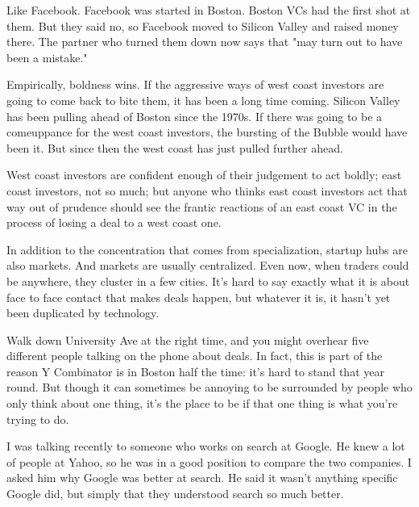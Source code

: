 Like Facebook. Facebook was started in
                  Boston. Boston VCs had the first shot at them. But they said
                  no, so Facebook moved to Silicon Valley and raised money
                  there. The partner who turned them down now says that "may
                  turn out to have been a mistake."

Empirically,
                  boldness wins. If the aggressive ways of west coast investors
                  are going to come back to bite them, it has been a long time
                  coming. Silicon Valley has been pulling ahead of Boston since
                  the 1970s. If there was going to be a comeuppance for the west
                  coast investors, the bursting of the Bubble would have been
                  it. But since then the west coast has just pulled further
                  ahead.

West coast investors are confident enough of
                  their judgement to act boldly; east coast investors, not so
                  much; but anyone who thinks east coast investors act that way
                  out of prudence should see the frantic reactions of an east
                  coast VC in the process of losing a deal to a west coast
                  one.

In addition to the concentration that comes
                  from specialization, startup hubs are also markets. And
                  markets are usually centralized. Even now, when traders could
                  be anywhere, they cluster in a few cities. It's hard to say
                  exactly what it is about face to face contact that makes deals
                  happen, but whatever it is, it hasn't yet been duplicated by
                  technology.

Walk down University Ave at the right
                  time, and you might overhear five different people talking on
                  the phone about deals. In fact, this is part of the reason Y
                  Combinator is in Boston half the time: it's hard to stand that
                  year round. But though it can sometimes be annoying to be
                  surrounded by people who only think about one thing, it's the
                  place to be if that one thing is what you're trying to do.

I
                  was talking recently to someone who works on search at Google.
                  He knew a lot of people at Yahoo, so he was in a good position
                  to compare the two companies. I asked him why Google was
                  better at search. He said it wasn't anything specific Google
                  did, but simply that they understood search so much better.

